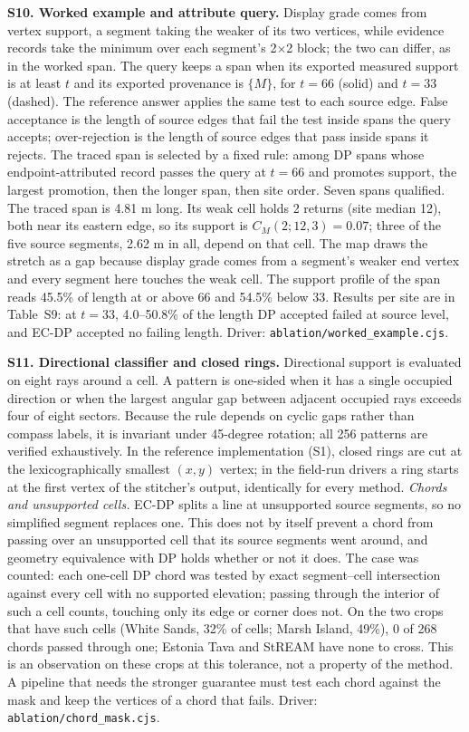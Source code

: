 \documentclass[11pt]{article}
\begin{document}
\vspace{4mm}
\noindent\textbf{S10. Worked example and attribute query.} Display grade comes from vertex support, a segment taking the weaker of its two vertices, while evidence records take the minimum over each segment's 2$\times$2 block; the two can differ, as in the worked span. The query keeps a span when its exported measured support is at least $t$ and its exported provenance is $\{M\}$, for $t=66$ (solid) and $t=33$ (dashed). The reference answer applies the same test to each source edge. False acceptance is the length of source edges that fail the test inside spans the query accepts; over-rejection is the length of source edges that pass inside spans it rejects. The traced span is selected by a fixed rule: among DP spans whose endpoint-attributed record passes the query at $t=66$ and promotes support, the largest promotion, then the longer span, then site order. Seven spans qualified. The traced span is 4.81 m long. Its weak cell holds 2 returns (site median 12), both near its eastern edge, so its support is $C_M(2;12,3)=0.07$; three of the five source segments, 2.62 m in all, depend on that cell. The map draws the stretch as a gap because display grade comes from a segment's weaker end vertex and every segment here touches the weak cell. The support profile of the span reads 45.5\% of length at or above 66 and 54.5\% below 33. Results per site are in Table~S9: at $t=33$, 4.0--50.8\% of the length DP accepted failed at source level, and EC-DP accepted no failing length. Driver: \texttt{ablation/worked\_example.cjs}.

\vspace{4mm}
\noindent\textbf{S11. Directional classifier and closed rings.} Directional support is evaluated on eight rays around a cell. A pattern is one-sided when it has a single occupied direction or when the largest angular gap between adjacent occupied rays exceeds four of eight sectors. Because the rule depends on cyclic gaps rather than compass labels, it is invariant under 45-degree rotation; all 256 patterns are verified exhaustively. In the reference implementation (S1), closed rings are cut at the lexicographically smallest $(x,y)$ vertex; in the field-run drivers a ring starts at the first vertex of the stitcher's output, identically for every method. \emph{Chords and unsupported cells.} EC-DP splits a line at unsupported source segments, so no simplified segment replaces one. This does not by itself prevent a chord from passing over an unsupported cell that its source segments went around, and geometry equivalence with DP holds whether or not it does. The case was counted: each one-cell DP chord was tested by exact segment--cell intersection against every cell with no supported elevation; passing through the interior of such a cell counts, touching only its edge or corner does not. On the two crops that have such cells (White Sands, 32\% of cells; Marsh Island, 49\%), 0 of 268 chords passed through one; Estonia Tava and StREAM have none to cross. This is an observation on these crops at this tolerance, not a property of the method. A pipeline that needs the stronger guarantee must test each chord against the mask and keep the vertices of a chord that fails. Driver: \texttt{ablation/chord\_mask.cjs}.
\end{document}
